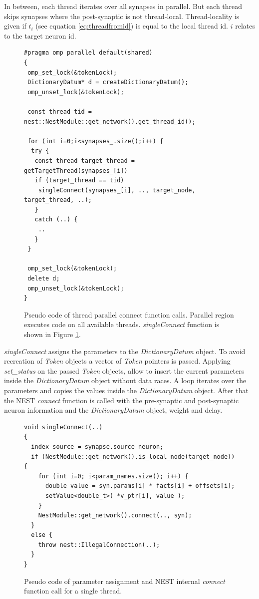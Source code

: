 In between, each thread iterates over all synapses in parallel.
But each thread skips synapses where the post-synaptic is not thread-local.
Thread-locality is given if $t_i$ (see equation \ref{eq:threadfromid}) is equal to the local thread id.
$i$ relates to the target neuron id.
\begin{figure}[ht!]
\begin{lstlisting}[style=cppcode]
#pragma omp parallel default(shared)
{ 
 omp_set_lock(&tokenLock);
 DictionaryDatum* d = createDictionaryDatum();  
 omp_unset_lock(&tokenLock);

 const thread tid = nest::NestModule::get_network().get_thread_id();
      
 for (int i=0;i<synapses_.size();i++) {
  try {
   const thread target_thread = getTargetThread(synapses_[i])
   if (target_thread == tid)
    singleConnect(synapses_[i], .., target_node, target_thread, ..);
   }
   catch (..) {
    ..
   }
 }
  
 omp_set_lock(&tokenLock);
 delete d;  
 omp_unset_lock(&tokenLock);
}
\end{lstlisting}
\caption{Pseudo code of thread parallel connect function calls.
Parallel region executes code on all available threads.
\emph{singleConnect} function is shown in Figure \ref{fig:singleConnect}.
}
\end{figure}
\emph{singleConnect} assigns the parameters to the \emph{DictionaryDatum} object.
To avoid recreation of \emph{Token} objects a vector of  \emph{Token} pointers is
passed. Applying \emph{set\_{}status} on the passed \emph{Token} objects, allow to
insert the current parameters inside the \emph{DictionaryDatum} object without data races.
A loop iterates over the parameters and copies the values inside the \emph{DictionaryDatum} object.
After that the NEST \emph{connect} function is called with the pre-synaptic and post-synaptic
neuron information and the \emph{DictionaryDatum} object, weight and delay.
\begin{figure}[ht!]
\begin{lstlisting}[style=cppcode]
void singleConnect(..)
{
  index source = synapse.source_neuron;
  if (NestModule::get_network().is_local_node(target_node)) { 
    for (int i=0; i<param_names.size(); i++) {
      double value = syn.params[i] * facts[i] + offsets[i];
      setValue<double_t>( *v_ptr[i], value );
    }
    NestModule::get_network().connect(.., syn);
  }
  else {
    throw nest::IllegalConnection(..);
  }
}
\end{lstlisting}
\caption{Pseudo code of parameter assignment and NEST internal \emph{connect} function call for a single thread.}
\label{fig:singleConnect}
\end{figure}

